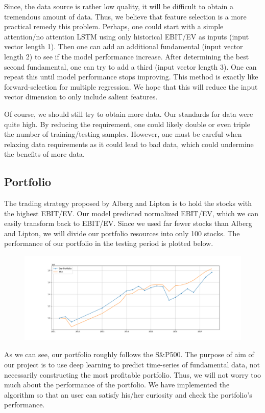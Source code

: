 \documentclass[11pt, letterpaper, headings=standardclasses]{scrartcl}
\begin{document}
    Since, the data source is rather low quality, it will be difficult to obtain a tremendous amount of data. Thus, we believe that feature selection is a more practical remedy this problem. Perhaps, one could start with a simple attention/no attention LSTM using only historical EBIT/EV as inputs (input vector length 1). Then one can add an additional fundamental (input vector length 2) to see if the model performance increase. After determining the best second fundamental, one can try to add a third (input vector length 3). One can repeat this until model performance stops improving. This method is exactly like forward-selection for multiple regression. We hope that this will reduce the input vector dimension to only include salient features.
    
    Of course, we should still try to obtain more data. Our standards for data were quite high. By reducing the requirement, one could likely double or even triple the number of training/testing samples. However, one must be careful when relaxing data requirements as it could lead to bad data, which could undermine the benefits of more data.
    
    \subsection{Portfolio}
    The trading strategy proposed by Alberg and Lipton is to hold the stocks with the highest EBIT/EV. Our model predicted normalized EBIT/EV, which we can easily transform back to EBIT/EV. Since we used far fewer stocks than Alberg and Lipton, we will divide our portfolio resources into only 100 stocks. The performance of our portfolio in the testing period is plotted below.
    
    \begin{figure}[H]
    \centering
    \includegraphics[width=1\textwidth]{portfolio.png}
    \end{figure}
    
    As we can see, our portfolio roughly follows the S\&P500. The purpose of aim of our project is to use deep learning to predict time-series of fundamental data, not necessarily constructing the most profitable portfolio. Thus, we will not worry too much about the performance of the portfolio. We have implemented the algorithm so that an user can satisfy his/her curiosity and check the portfolio's performance. 
    
\end{document}
